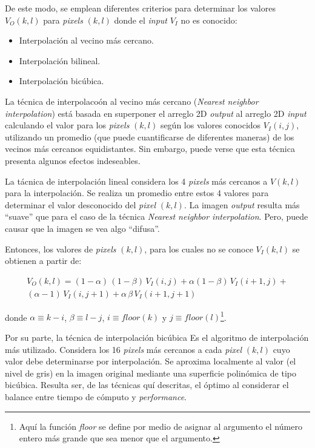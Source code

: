 %
De este modo, se emplean diferentes criterios para determinar los valores $V_{O}(k, l)$ para \textit{pixels} $(k, l)$ donde el \textit{input} $V_{I}$ no es 
conocido:

\begin{itemize}
 \item Interpolaci\'on al vecino m\'as cercano.
 \item Interpolaci\'on bilineal.
 \item Interpolaci\'on bic\'ubica.
\end{itemize}

La t\'ecnica de interpolaco\'on al vecino m\'as cercano (\textit{Nearest neighbor interpolation}) est\'a basada en superponer el arreglo 2D \textit{output}
al arreglo 2D \textit{input} calculando el valor para los \textit{pixels} $(k, l)$ seg\'un los valores conocidos $V_{I}(i, j)$, utilizando un promedio 
(que puede cuantificarse de diferentes maneras) de 
los vecinos m\'as cercanos equidistantes. 
%
Sin embargo, puede verse que esta t\'ecnica presenta algunos efectos indeseables.
%

%
La t\'acnica de interpolaci\'on lineal considera los 4 \textit{pixels} m\'as cercanos a $V(k, l)$ para la interpolaci\'on.
%
Se realiza un promedio entre estos 4 valores para determinar el valor desconocido del \textit{pixel} $(k, l)$.
%
La imagen \textit{output} resulta m\'as ``suave'' que para el caso de la t\'ecnica \textit{Nearest neighbor interpolation}.
%
Pero, puede causar que la imagen se vea algo ``difusa''.
%

%
Entonces, los valores de \textit{pixels} $(k, l)$, para los cuales no se conoce $V_{I}(k, l)$ se obtienen a partir de:


\begin{eqnarray}
	V_{O}(k, l) = (1 - \alpha)\, (1-\beta) \, V_{I}(i,j) + \alpha (1 - \beta) \, V_{I}(i +1, j) + \nonumber \\
	(\alpha -1) \, V_{I}(i, j+1) + \alpha \, \beta \, V_{I}(i +1, j +1)
\label{EqXXIX}
\end{eqnarray}

donde $\alpha \equiv k - i$, $\beta \equiv l -j$, $i \equiv floor(k)$ y $j \equiv floor(l)$\footnote{Aqu\'i la funci\'on \textit{floor}
se define por medio de asignar al argumento el n\'umero entero m\'as grande que sea menor que el argumento.}.


Por su parte, la t\'ecnica de interpolaci\'on bic\'ubica Es el algoritmo de interpolaci\'on m\'as utilizado.
%
Considera los 16 \textit{pixels} m\'as cercanos a cada \textit{pixel} $(k, l)$ cuyo valor debe determinarse por interpolaci\'on.
%
Se aproxima localmente al valor (el nivel de gris) en la imagen original mediante una superficie polin\'omica de tipo bic\'ubica.
%
Resulta ser, de las t\'ecnicas qu\'i descritas, el \'optimo al considerar el balance entre tiempo de c\'omputo y \textit{performance}.
%


